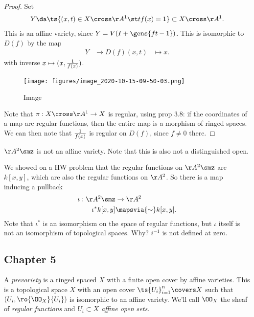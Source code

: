 \begin{proof}

Set
\begin{align*}  
Y \da \ts{(x, t) \in X\cross \AA^1 \st tf(x) = 1} \subset X\cross \AA^1
.\end{align*} This is an affine variety, since
\(Y = V(I + \gens{ft-1})\). This is isomorphic to \(D(f)\) by the map
\begin{align*}  
Y &\to D(f)
(x, t) &\mapsto x
.\end{align*} with inverse \(x \mapsto (x, {1\over f(x)})\).

\begin{figure}
\centering
\texttt{[image: figures/image\_2020-10-15-09-50-03.png]}
\caption{Image}
\end{figure}

Note that \(\pi: X\cross \AA^1 \to X\) is regular, using prop 3.8: if
the coordinates of a map are regular functions, then the entire map is a
morphism of ringed spaces. We can then note that \(1\over f(x)\) is
regular on \(D(f)\), since \(f\neq 0\) there.

\end{proof}

\begin{example}

\(\AA^2 \smz\) is not an affine variety. Note that this is also not a
distinguished open.

We showed on a HW problem that the regular functions on \(\AA^2\smz\)
are \(k[x, y]\), which are also the regular functions on \(\AA^2\). So
there is a map inducing a pullback
\begin{align*}  
\iota: \AA^2\smz &\to \AA^2 \\
\iota^* k[x, y] &\mapsvia{\sim} k[x, y]
.\end{align*} Note that \(\iota^*\) is an isomorphism on the space of
regular functions, but \(\iota\) itself is not an isomorphism of
topological spaces. Why? \(i^{-1}\) is not defined at zero.

\end{example}

\hypertarget{chapter-5}{%
\subsection{Chapter 5}\label{chapter-5}}

\begin{definition}[Prevariety]

A \emph{prevariety} is a ringed spaced \(X\) with a finite open cover by
affine varieties. This is a topological space \(X\) with an open cover
\(\ts{U_i}_{i=1}^n \covers X\) such that \((U_i, \ro{\OO_X}{U_i} )\) is
isomorphic to an affine variety. We'll call \(\OO_X\) the sheaf of
\emph{regular functions} and \(U_i\subset X\) \emph{affine open sets}.

\end{definition}

